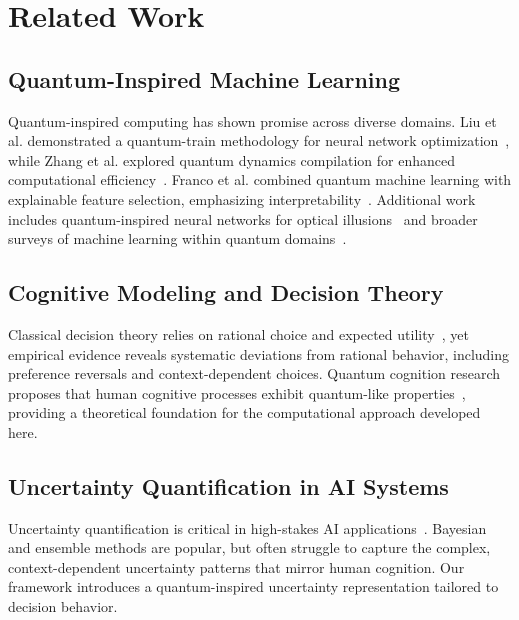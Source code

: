 \documentclass[conference]{IEEEtran}
\begin{document}
\section{Related Work}

\subsection{Quantum-Inspired Machine Learning}

Quantum-inspired computing has shown promise across diverse domains. Liu et al. demonstrated a quantum-train methodology for neural network optimization~\cite{liu2024quantum}, while Zhang et al. explored quantum dynamics compilation for enhanced computational efficiency~\cite{zhang2024scalable}. Franco et al. combined quantum machine learning with explainable feature selection, emphasizing interpretability~\cite{franco2025quantum}. Additional work includes quantum-inspired neural networks for optical illusions~\cite{maksymov2024quantum} and broader surveys of machine learning within quantum domains~\cite{dunjko2018machine}.

\subsection{Cognitive Modeling and Decision Theory}

Classical decision theory relies on rational choice and expected utility~\cite{kahneman2011thinking}, yet empirical evidence reveals systematic deviations from rational behavior, including preference reversals and context-dependent choices. Quantum cognition research proposes that human cognitive processes exhibit quantum-like properties~\cite{busemeyer2012quantum}, providing a theoretical foundation for the computational approach developed here.

\subsection{Uncertainty Quantification in AI Systems}

Uncertainty quantification is critical in high-stakes AI applications~\cite{gal2016dropout}. Bayesian and ensemble methods are popular, but often struggle to capture the complex, context-dependent uncertainty patterns that mirror human cognition. Our framework introduces a quantum-inspired uncertainty representation tailored to decision behavior.
\end{document}
